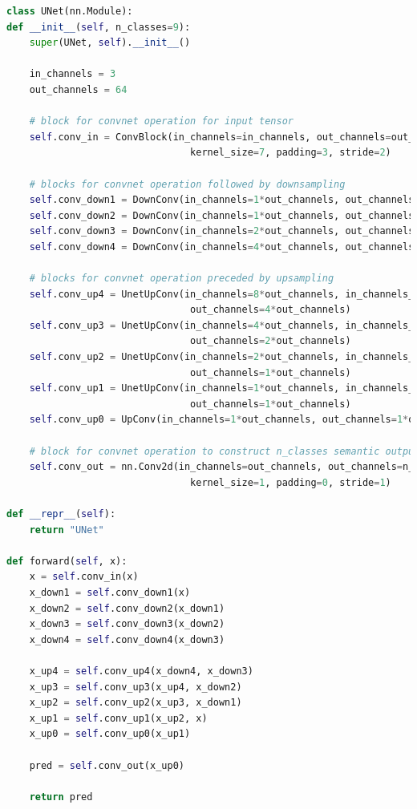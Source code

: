 \documentclass[11pt]{article}
\begin{document}
\begin{lstlisting}[language=Python, basicstyle=\scriptsize]
class UNet(nn.Module):
def __init__(self, n_classes=9):
    super(UNet, self).__init__()

    in_channels = 3
    out_channels = 64

    # block for convnet operation for input tensor
    self.conv_in = ConvBlock(in_channels=in_channels, out_channels=out_channels, 
                                kernel_size=7, padding=3, stride=2)

    # blocks for convnet operation followed by downsampling
    self.conv_down1 = DownConv(in_channels=1*out_channels, out_channels=1*out_channels)
    self.conv_down2 = DownConv(in_channels=1*out_channels, out_channels=2*out_channels)
    self.conv_down3 = DownConv(in_channels=2*out_channels, out_channels=4*out_channels)
    self.conv_down4 = DownConv(in_channels=4*out_channels, out_channels=8*out_channels)

    # blocks for convnet operation preceded by upsampling
    self.conv_up4 = UnetUpConv(in_channels=8*out_channels, in_channels_skip=4*out_channels, 
                                out_channels=4*out_channels)
    self.conv_up3 = UnetUpConv(in_channels=4*out_channels, in_channels_skip=2*out_channels, 
                                out_channels=2*out_channels)
    self.conv_up2 = UnetUpConv(in_channels=2*out_channels, in_channels_skip=1*out_channels, 
                                out_channels=1*out_channels)
    self.conv_up1 = UnetUpConv(in_channels=1*out_channels, in_channels_skip=1*out_channels, 
                                out_channels=1*out_channels)
    self.conv_up0 = UpConv(in_channels=1*out_channels, out_channels=1*out_channels)
    
    # block for convnet operation to construct n_classes semantic outputs
    self.conv_out = nn.Conv2d(in_channels=out_channels, out_channels=n_classes, 
                                kernel_size=1, padding=0, stride=1)

def __repr__(self):
    return "UNet"        

def forward(self, x):
    x = self.conv_in(x)
    x_down1 = self.conv_down1(x)
    x_down2 = self.conv_down2(x_down1)
    x_down3 = self.conv_down3(x_down2)
    x_down4 = self.conv_down4(x_down3)

    x_up4 = self.conv_up4(x_down4, x_down3)
    x_up3 = self.conv_up3(x_up4, x_down2)
    x_up2 = self.conv_up2(x_up3, x_down1)
    x_up1 = self.conv_up1(x_up2, x)
    x_up0 = self.conv_up0(x_up1)

    pred = self.conv_out(x_up0)

    return pred
\end{lstlisting}
\end{document}
